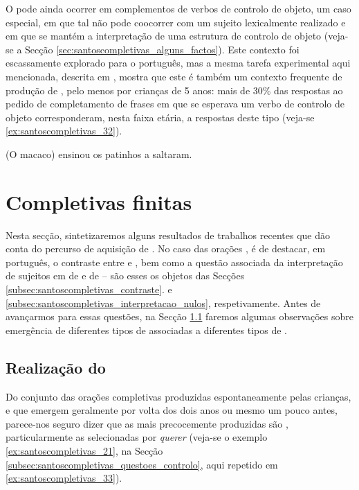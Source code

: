 \documentclass[output=paper]{LSP/langsci}
\begin{document}
O  pode ainda ocorrer em complementos de verbos de controlo de objeto, um caso especial, em que tal  não pode coocorrer com um sujeito lexicalmente realizado e em que se mantém a interpretação de uma estrutura de controlo de objeto (veja-se a Secção \ref{sec:santoscompletivas_alguns_factos}). Este contexto foi escassamente explorado para o português, mas a mesma tarefa experimental aqui mencionada, descrita em \citet{santos_etal2016}, mostra que este é também um contexto frequente de produção de , pelo menos por crianças de 5 anos: mais de 30\% das respostas ao pedido de completamento de frases em que se esperava um verbo de controlo de objeto corresponderam, nesta faixa etária, a respostas deste tipo (veja-se \ref{ex:santoscompletivas_32}).

\ea\label{ex:santoscompletivas_32} (O macaco) ensinou os patinhos a saltaram.
\z

\section{Completivas finitas}
\label{sec:santoscompletivas_completivas_finitas}

Nesta secção, sintetizaremos alguns resultados de trabalhos recentes que dão conta do percurso de aquisição de . No caso das orações , é de destacar, em português, o contraste entre  e , bem como a questão associada da interpretação de sujeitos em  de  e de  – são esses os objetos das Secções \ref{subsec:santoscompletivas_contraste}. e \ref{subsec:santoscompletivas_interpretacao_nulos}, respetivamente. Antes de avançarmos para essas questões, na Secção \ref{subsec:santoscompletivas_realizacao_complementador} faremos algumas observações sobre emergência de diferentes tipos de  associadas a diferentes tipos de .


\subsection{Realização do }
\label{subsec:santoscompletivas_realizacao_complementador}

Do conjunto das orações completivas produzidas espontaneamente pelas crianças, e que emergem geralmente por volta dos dois anos ou mesmo um pouco antes, parece-nos seguro dizer que as mais precocemente produzidas são , particularmente as selecionadas por \textit{querer} (veja-se o exemplo \ref{ex:santoscompletivas_21}, na Secção \ref{subsec:santoscompletivas_questoes_controlo}, aqui repetido em \ref{ex:santoscompletivas_33}). 
\end{document}
